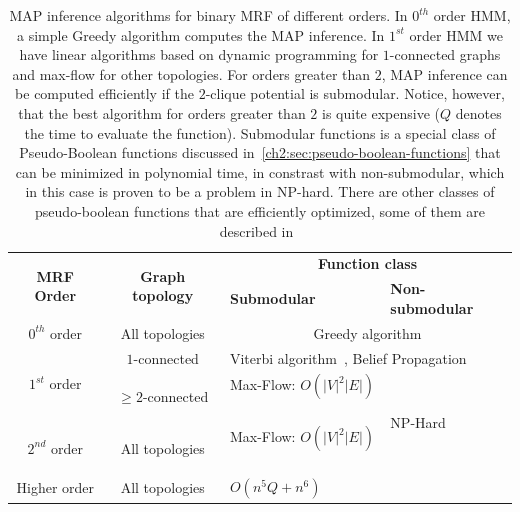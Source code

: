\begin{table}
\center
\scriptsize
\begin{tabular}{|c|c|m{14em}|m{10em}|}
\hline
\multirow{2}{*}{\textbf{MRF Order}} & \multirow{2}{*}{\textbf{Graph topology}} & \multicolumn{2}{c|}{\textbf{Function class}} \\
\cline{3-4}
&   & \textbf{Submodular} & \textbf{Non-submodular} \\
\hline
$0^{th}$ order & All topologies & \multicolumn{2}{c|}{Greedy algorithm} \\
\hline
\multirow{2}{*}{$1^{st}$ order} & $1$-connected & \multicolumn{2}{m{24em}|}{Viterbi algorithm~\cite{viterbi67}, Belief Propagation~\cite{pearl82}} \\
\cline{2-4}
& $\geq 2$-connected & Max-Flow: $\scriptstyle O(|V|^2|E|)$~\cite{kolmogorov04whatenergies} & \multirow{2}{=}[-2mm]{NP-Hard~\cite{nemhauser81}} \\
\cline{1-3}
$2^{nd}$ order & All topologies & Max-Flow: $\scriptstyle O(|V|^2|E|)$~\cite{billionnet85} & \\
\cline{1-3}
Higher order & All topologies & $O(n^5Q + n^6)$~\cite{orlin09faster} & \\
\hline
\end{tabular}
\caption{MAP inference algorithms for binary MRF of different orders. In $0^{th}$ order HMM, a simple Greedy algorithm computes the MAP inference. In $1^{st}$ order HMM we have linear algorithms based on dynamic programming for $1$-connected graphs and max-flow for other topologies. For orders greater than $2$, MAP inference can be computed efficiently if the $2$-clique potential is submodular. Notice, however, that the best algorithm for orders greater than $2$ is quite expensive ($Q$ denotes the time to evaluate the function). Submodular functions is a special class of Pseudo-Boolean functions discussed in~\cref{ch2:sec:pseudo-boolean-functions} that can be minimized in polynomial time, in constrast with non-submodular, which in this case is proven to be a problem in NP-hard. There are other classes of pseudo-boolean functions that are efficiently optimized, some of them are described in~\cite{boros02pseudo}   }
\label{ch2:tab:map-inference-binary-mrf}
\end{table}



